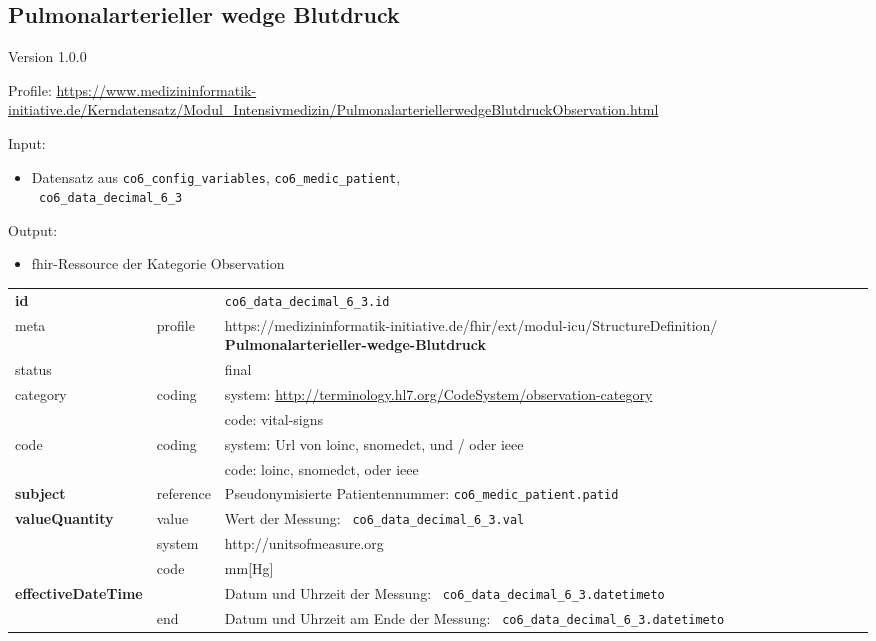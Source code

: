 \subsection{Pulmonalarterieller wedge Blutdruck} 
\noindent Version 1.0.0

\noindent Profile: \url{https://www.medizininformatik-initiative.de/Kerndatensatz/Modul_Intensivmedizin/PulmonalarteriellerwedgeBlutdruckObservation.html}

\noindent Input:
\begin{itemize}
	\item Datensatz aus \texttt{co6\_config\_variables}, \texttt{co6\_medic\_patient}, \\ \texttt{
co6\_data\_decimal\_6\_3}
\end{itemize}
Output:
\begin{itemize}
        \item \ac{fhir}-Ressource der Kategorie \glqq Observation\grqq{}
\end{itemize}
\begin{longtable}{|l|l|p{7.5cm}|}
        \hline
        \rowcolor{lightgray} \multicolumn{3}{|l|}{Data Mapping (inhaltlich)} \\ \hline
        \textbf{id} &  & \texttt{co6\_data\_decimal\_6\_3.id} \\ \hline
	meta & profile & https://medizininformatik-initiative.de/fhir/ext/modul-icu/StructureDefinition/\textbf{
Pulmonalarterieller-wedge-Blutdruck} \\ \hline 
	status &  & final   \\ \hline 
	category & coding & system: \url{http://terminology.hl7.org/CodeSystem/observation-category} \\
\cline{3-3}
	& & code: vital-signs\\ \hline
	code & coding & system: Url von \ac{loinc}, \ac{snomedct}, und / oder \ac{ieee} \\ 
	\cline{3-3} 
	 &  & code: \ac{loinc}, \ac{snomedct}, oder \ac{ieee} \\ \hline
	 \textbf{subject}  & reference & Pseudonymisierte Patientennummer: \texttt{co6\_medic\_patient.patid} \\ \hline
	 \textbf{valueQuantity}  & value & Wert der Messung: \texttt{
co6\_data\_decimal\_6\_3.val} \\
        \cline{2-3}
         & system & http://unitsofmeasure.org \\
         \cline{2-3}
         & code & mm[Hg] \\ \hline
     \textbf{effectiveDateTime}  & & Datum und Uhrzeit der Messung: \texttt{
co6\_data\_decimal\_6\_3.datetimeto} \\
    \cline{2-3}
     & end & Datum und Uhrzeit am Ende der Messung: \texttt{
co6\_data\_decimal\_6\_3.datetimeto} \\ \hline
\end{longtable}


